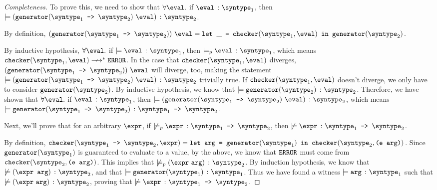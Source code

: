 \begin{proof}[Completeness]
  To prove this, we need to show that $\forall\eval.$ if $\hastype{\eval}{\syntype_1}$, then $\models \hastype{(\mkgen{\mkfun{\syntype_1}{\syntype_2}} \ \eval)}{\syntype_2}$.
  
  By definition, $(\mkgen{\mkfun{\syntype_1}{\syntype_2}}) \ \eval = \letin{\_}{\mkche{\syntype_1}{\eval}}{\mkgen{\syntype_2}}$.

  By inductive hypothesis, $\forall\eval.$ if $\models \hastype{\eval}{\syntype_1}$, then $\models_p \hastype{\eval}{\syntype_1}$, which means $\mkche{\syntype_1}{\eval}\nsmallsteps[] \eerror$. In the case that $\mkche{\syntype_1}{\eval}$ diverges, $(\mkgen{\mkfun{\syntype_1}{\syntype_2}}) \ \eval$ will diverge, too, making the statement $\models \hastype{(\mkgen{\mkfun{\syntype_1}{\syntype_2}} \ \eval)}{\syntype_2}$ trivially true. If $\mkche{\syntype_1}{\eval}$ doesn't diverge, we only have to consider $\mkgen{\syntype_2}$. By inductive hypothesis, we know that $\models \hastype{\mkgen{\syntype_2}}{\syntype_2}$. Therefore, we have shown that $\forall\eval.$ if $\hastype{\eval}{\syntype_1}$, then $\models \hastype{(\mkgen{\mkfun{\syntype_1}{\syntype_2}} \ \eval)}{\syntype_2}$, which means $\models \hastype{\mkgen{\mkfun{\syntype_1}{\syntype_2}}}{\mkfun{\syntype_1}{\syntype_2}}$.

  Next, we'll prove that for an arbitrary $\expr$, if $\not\models_p \hastype{\expr}{\mkfun{\syntype_1}{\syntype_2}}$, then $\not\models \hastype{\expr}{\mkfun{\syntype_1}{\syntype_2}}$.

  By definition, $\mkche{\mkfun{\syntype_1}{\syntype_2}}{\expr} = \texttt{let arg = }\mkgen{\syntype_1} \texttt{ in }\mkche{\syntype_2}{\texttt{(e arg)}}$. Since $\mkgen{\syntype_1}$ is guaranteed to evaluate to a value, by the above, we know that $\texttt{ERROR}$ must come from $\mkche{\syntype_2}{\texttt{(e arg)}}$. This implies that $\not\models_p \hastype{(\expr\ \texttt{arg})}{\syntype_2}$. By induction hypothesis, we know that $\not\models \hastype{(\texttt{\expr\ \texttt{arg}})}{\syntype_2}$, and that $\models \hastype{\mkgen{\syntype_1}}{\syntype_1}$. Thus we have found a witness $\models \hastype{\texttt{arg}}{\syntype_1}$ such that $\not\models \hastype{(\expr \ \texttt{arg})}{\syntype_2}$, proving that $\not\models \hastype{\expr}{\mkfun{\syntype_1}{\syntype_2}}$.

\end{proof}


